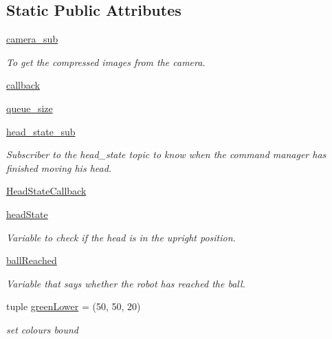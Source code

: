 \subsection*{Static Public Attributes}
\begin{DoxyCompactItemize}
\item 
\hyperlink{classballDetection_1_1image__feature_ae58b2d15e5dc42eec2d49c6373f8e90b}{camera\+\_\+sub}
\begin{DoxyCompactList}\small\item\em To get the compressed images from the camera. \end{DoxyCompactList}\item 
\hyperlink{classballDetection_1_1image__feature_ac7ef080bc4849ca6a0fd93d6a4427381}{callback}
\item 
\hyperlink{classballDetection_1_1image__feature_a85c33da670bc2705900afcfa12cb2f66}{queue\+\_\+size}
\item 
\hyperlink{classballDetection_1_1image__feature_a90bb9d5a57637e7cef2ff093778b3182}{head\+\_\+state\+\_\+sub}
\begin{DoxyCompactList}\small\item\em Subscriber to the head\+\_\+state topic to know when the command manager has finished moving his head. \end{DoxyCompactList}\item 
\hyperlink{classballDetection_1_1image__feature_a17e637dcbb2639eab5dfefd9eccfb7d5}{Head\+State\+Callback}
\item 
\hyperlink{classballDetection_1_1image__feature_ac4aef32147d5a7ab2a5702b96d123ca5}{head\+State}
\begin{DoxyCompactList}\small\item\em Variable to check if the head is in the upright position. \end{DoxyCompactList}\item 
\hyperlink{classballDetection_1_1image__feature_ae7733d80f1a59b84036b204c44f1d594}{ball\+Reached}
\begin{DoxyCompactList}\small\item\em Variable that says whether the robot has reached the ball. \end{DoxyCompactList}\item 
tuple \hyperlink{classballDetection_1_1image__feature_a2b1d1abdc4e93d6a6eba6ba40f5a3f77}{green\+Lower} = (50, 50, 20)
\begin{DoxyCompactList}\small\item\em set colours bound \end{DoxyCompactList}\item 

\end{DoxyCompactItemize}
